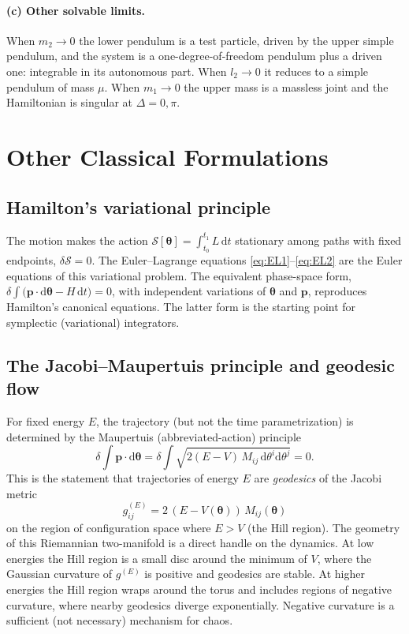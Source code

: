 \documentclass[11pt,a4paper]{book}
\theoremstyle{definition}
\theoremstyle{remark}
\newcommand{\dd}{\mathrm{d}}
\begin{document}
\paragraph{(c) Other solvable limits.}
When $m_2\to0$ the lower pendulum is a test particle, driven by the upper simple pendulum, and the system is a
one-degree-of-freedom pendulum plus a driven one: integrable in its autonomous part. When $l_2\to0$ it reduces to
a simple pendulum of mass $\mu$. When $m_1\to0$ the upper mass is a massless joint and the Hamiltonian is singular
at $\Delta=0,\pi$.

\section{Other Classical Formulations}
\label{sec:others}

\subsection{Hamilton's variational principle}

The motion makes the action $\mathcal S[\bm\theta]=\int_{t_0}^{t_1}L\,\dd t$ stationary among paths with fixed endpoints,
$\delta\mathcal S=0$. The Euler--Lagrange equations \eqref{eq:EL1}--\eqref{eq:EL2} are the Euler equations of this
variational problem. The equivalent phase-space form,
$\delta\int\big(\bm p\cdot\dd\bm\theta-H\,\dd t\big)=0$, with independent variations of $\bm\theta$ and $\bm p$,
reproduces Hamilton's canonical equations. The latter form is the starting point for symplectic (variational)
integrators.

\subsection{The Jacobi--Maupertuis principle and geodesic flow}

For fixed energy $E$, the trajectory (but not the time parametrization) is determined by the Maupertuis
(abbreviated-action) principle~\cite{arnold,abrahammarsden}
\begin{equation}
  \delta\int\bm p\cdot\dd\bm\theta=\delta\int\sqrt{2(E-V)\,M_{ij}\,\dd\theta^i\dd\theta^j}=0 .
\end{equation}
This is the statement that trajectories of energy $E$ are \emph{geodesics} of the Jacobi metric
\begin{equation}
  g^{(E)}_{ij}=2\,(E-V(\bm\theta))\,M_{ij}(\bm\theta)
\end{equation}
on the region of configuration space where $E>V$ (the Hill region). The geometry of this Riemannian two-manifold is
a direct handle on the dynamics. At low energies the Hill region is a small disc around the minimum of $V$, where the
Gaussian curvature of $g^{(E)}$ is positive and geodesics are stable. At higher energies the Hill region wraps around the
torus and includes regions of negative curvature, where nearby geodesics diverge exponentially. Negative curvature is
a sufficient (not necessary) mechanism for chaos.
\end{document}
